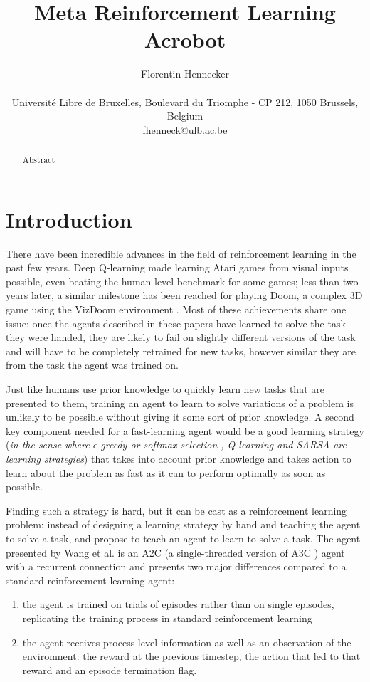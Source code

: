 \documentclass[letterpaper]{article}
\title{Meta Reinforcement Learning Acrobot}
\author{Florentin Hennecker \\
\mbox{}\\
Universit\'e Libre de Bruxelles, Boulevard du Triomphe - CP 212, 1050
Brussels, Belgium \\
fhenneck@ulb.ac.be}
\begin{document}
\maketitle

\begin{abstract}
	Abstract
\end{abstract}

\section{Introduction}
There have been incredible advances in the field of reinforcement learning
in the past few years. Deep Q-learning \citep{dqn, dqn_nature} made learning Atari
games from visual inputs possible, even beating the human level benchmark
for some games; less than two years later, a similar milestone has been reached
for playing Doom, a complex 3D game \citep{doom} using the VizDoom environment
\citep{vizdoom}. Most of these achievements share one issue: once the agents
described in these papers have learned to solve the task they were handed,
they are likely to fail on slightly different versions of the task and will
have to be completely retrained for new tasks, however similar they are from
the task the agent was trained on.

Just like humans use prior knowledge to quickly learn new tasks that are
presented to them, training an agent to learn to solve variations of a problem
is unlikely to be possible without giving it some sort of prior knowledge.
A second key component needed for a fast-learning agent would be a good
learning strategy (\textit{in the sense where $\epsilon$-greedy or softmax selection
\citep{suttonbarto}, Q-learning \citep{qlearning} and SARSA \citep{sarsa} 
are learning strategies})
that takes into account prior knowledge and takes action
to learn about the problem as fast as it can to perform optimally as
soon as possible.

Finding such a strategy is hard, but it can be cast as a reinforcement
learning problem: instead of designing a learning strategy by hand and
teaching the agent to solve a task, \cite{learningtorl}
and \cite{fastrlviaslowrl} propose to
teach an agent to learn to solve a task. The agent presented by Wang et al. is 
an A2C (a single-threaded version of A3C \citep{a3c})
agent with a recurrent connection and presents
two major differences compared to a standard reinforcement learning agent: 
\begin{enumerate}
	\item the agent is trained on trials of episodes rather than on single
		episodes, replicating the training process in standard 
		reinforcement learning
	\item the agent receives process-level information as well as
		an observation of the enviromnent: the reward at the previous
		timestep, the action that led to that reward and an 
		episode termination flag.
\end{enumerate}
\end{document}
